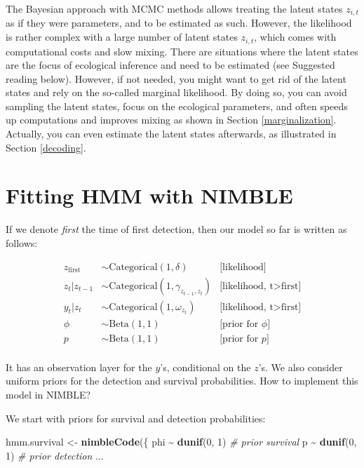 \documentclass[
  12pt,
]{krantz}
\newenvironment{Shaded}{\begin{snugshade}}{\end{snugshade}}
\newcommand{\CommentTok}[1]{\textcolor[rgb]{0.56,0.35,0.01}{\textit{#1}}}
\newcommand{\DecValTok}[1]{\textcolor[rgb]{0.00,0.00,0.81}{#1}}
\newcommand{\FunctionTok}[1]{\textcolor[rgb]{0.13,0.29,0.53}{\textbf{#1}}}
\newcommand{\NormalTok}[1]{#1}
\newcommand{\OtherTok}[1]{\textcolor[rgb]{0.56,0.35,0.01}{#1}}
\newcommand{\SpecialCharTok}[1]{\textcolor[rgb]{0.81,0.36,0.00}{\textbf{#1}}}
\begin{document}
The Bayesian approach with MCMC methods allows treating the latent states \(z_{i,t}\) as if they were parameters, and to be estimated as such. However, the likelihood is rather complex with a large number of latent states \(z_{i,t}\), which comes with computational costs and slow mixing. There are situations where the latent states are the focus of ecological inference and need to be estimated (see Suggested reading below). However, if not needed, you might want to get rid of the latent states and rely on the so-called marginal likelihood. By doing so, you can avoid sampling the latent states, focus on the ecological parameters, and often speeds up computations and improves mixing as shown in Section \ref{marginalization}. Actually, you can even estimate the latent states afterwards, as illustrated in Section \ref{decoding}.

\section{Fitting HMM with NIMBLE}\label{fittinghmmnimble}

If we denote \emph{first} the time of first detection, then our model so far is written as follows:

\begin{align*}
   z_{\text{first}} &\sim \text{Categorical}(1, \delta) &\text{[likelihood]}\\
   z_t | z_{t-1} &\sim \text{Categorical}(1, \gamma_{z_{t-1},z_{t}}) &\text{[likelihood, t>first]}\\
   y_t | z_{t} &\sim \text{Categorical}(1, \omega_{z_{t}}) &\text{[likelihood, t>first]}\\
  \phi &\sim \text{Beta}(1, 1) &\text{[prior for }\phi \text{]} \\
  p &\sim \text{Beta}(1, 1) &\text{[prior for }p \text{]} \\
\end{align*}

It has an observation layer for the \(y\)'s, conditional on the \(z\)'s. We also consider uniform priors for the detection and survival probabilities. How to implement this model in NIMBLE?

We start with priors for survival and detection probabilities:

\begin{Shaded}
\begin{Highlighting}[]
\NormalTok{hmm.survival }\OtherTok{\textless{}{-}} \FunctionTok{nimbleCode}\NormalTok{(\{}
\NormalTok{  phi }\SpecialCharTok{\textasciitilde{}} \FunctionTok{dunif}\NormalTok{(}\DecValTok{0}\NormalTok{, }\DecValTok{1}\NormalTok{) }\CommentTok{\# prior survival}
\NormalTok{  p }\SpecialCharTok{\textasciitilde{}} \FunctionTok{dunif}\NormalTok{(}\DecValTok{0}\NormalTok{, }\DecValTok{1}\NormalTok{) }\CommentTok{\# prior detection}
\NormalTok{...}
\end{Highlighting}
\end{Shaded}
\end{document}
